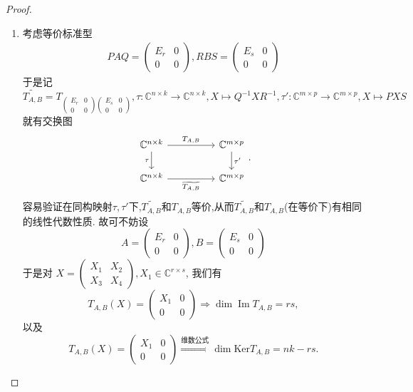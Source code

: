 \documentclass[../../main.tex]{subfiles}
\begin{document}
\begin{proof}
\begin{enumerate}
\item 考虑等价标准型
\begin{align}
PAQ = \begin{pmatrix} E_r & 0 \\ 0 & 0 \end{pmatrix}, RBS = \begin{pmatrix} E_s & 0 \\ 0 & 0 \end{pmatrix} \label{eq:1}
\end{align}
于是记
$$\widetilde{T_{A,B}} = T_{\begin{pmatrix} E_r & 0 \\ 0 & 0 \end{pmatrix} \begin{pmatrix} E_s & 0 \\ 0 & 0 \end{pmatrix}}, \tau : \mathbb{C}^{n \times k} \to \mathbb{C}^{n \times k}, X \mapsto Q^{-1}XR^{-1}, \tau' : \mathbb{C}^{m \times p} \to \mathbb{C}^{m \times p}, X \mapsto PXS$$
就有交换图
\[
\begin{tikzcd}
\mathbb{C}^{n\times k} \arrow[rr, "{T_{A,B}}"] \arrow[d, "\tau"'] &  & \mathbb{C}^{m\times p} \arrow[d, "\tau'"] \\
\mathbb{C}^{n\times k} \arrow[rr, "{\widetilde{T_{A,B}}}"']       &  & \mathbb{C}^{m\times p}                   
\end{tikzcd}.
\]
容易验证在同构映射$\tau ,\tau'$下,$\widetilde{T_{A,B}}$和$T_{A,B}$等价,从而$\widetilde{T_{A,B}}$和$T_{A,B}$(在等价下)有相同的线性代数性质.
故可不妨设
$$A = \begin{pmatrix} E_r & 0 \\ 0 & 0 \end{pmatrix}, B = \begin{pmatrix} E_s & 0 \\ 0 & 0 \end{pmatrix}$$
于是对 $X = \begin{pmatrix} X_1 & X_2 \\ X_3 & X_4 \end{pmatrix}, X_1 \in \mathbb{C}^{r \times s}$, 我们有
$$T_{A,B}(X) = \begin{pmatrix} X_1 & 0 \\ 0 & 0 \end{pmatrix} \Rightarrow \dim \operatorname{Im} T_{A,B} = rs,$$
以及
$$T_{A,B}(X) = \begin{pmatrix} X_1 & 0 \\ 0 & 0 \end{pmatrix} \stackrel{\text{维数公式}}{\Rightarrow} \dim \mathrm{Ker} T_{A,B} = nk - rs.$$


\end{enumerate}
\end{proof}
\end{document}

